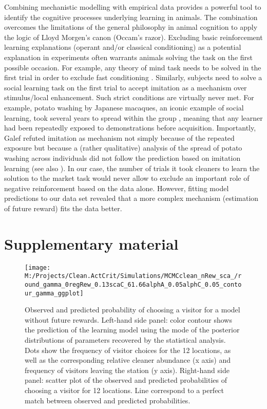 \documentclass[]{rsos}%
\newcommand{\beginsupplement}{ \setcounter{table}{0}     \renewcommand{\thetable}{S\arabic{table}}\setcounter{figure}{0} \renewcommand{\thefigure}{S\arabic{figure}}}
\begin{document}
Combining mechanistic modelling with empirical data provides a powerful
tool to identify the cognitive processes underlying learning in animals.
The combination overcomes the limitations of the general philosophy in
animal cognition to apply the logic of Lloyd Morgen's canon (Occam's
razor). Excluding basic reinforcement learning explanations (operant
and/or classical conditioning) as a potential explanation in experiments
often warrants animals solving the task on the first possible occasion.
For example, any theory of mind task needs to be solved in the first
trial in order to exclude fast conditioning \citep{heyes_Theory_1998}.
Similarly, subjects need to solve a social learning task on the first
trial to accept imitation as a mechanism over stimulus/local
enhancement. Such strict conditions are virtually never met. For
example, potato washing by Japanese macaques, an iconic example of
social learning, took several years to spread within the group
\citep{kawamura_Process_1959}, meaning that any learner had been repeatedly
exposed to demonstrations before acquisition. Importantly, Galef
\citep{galef_Question_1992} refuted imitation as mechanism not simply because
of the repeated exposure but because a (rather qualitative) analysis of
the spread of potato washing across individuals did not follow the
prediction based on imitation learning (see also
\citep{hirata_SweetPotato_2001}). In our case, the number of trials it took
cleaners to learn the solution to the market task would never allow to
exclude an important role of negative reinforcement based on the data
alone. However, fitting model predictions to our data set revealed that
a more complex mechanism (estimation of future reward) fits the data
better.

\newpage

\hypertarget{supplementary-material}{%
\section{Supplementary material}\label{supplementary-material}}

\beginsupplement

\begin{figure}[H]

{\centering \texttt{[image: M:/Projects/Clean.ActCrit/Simulations/MCMCclean\_nRew\_sca\_/round\_gamma\_0regRew\_0.13scaC\_61.66alphA\_0.05alphC\_0.05\_contour\_gamma\_ggplot]} 

}

\caption{Observed and predicted probability of choosing a visitor for a model without future rewards. Left-hand side panel: color contour shows the prediction of the learning model using the mode of the posterior distributions of parameters recovered by the statistical analysis. Dots show the frequency of visitor choices for the 12 locations, as well as the corresponding relative cleaner abundance (x axis) and frequency of visitors leaving the station (y axis). Right-hand side panel: scatter plot of the observed and predicted probabilities of choosing a visitor for 12 locations. Line correspond to a perfect match between observed and predicted probabilities.}\label{fig:nogamma}
\end{figure}
\end{document}

